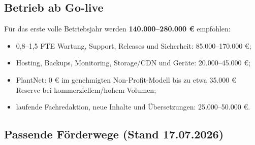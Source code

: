 \documentclass[10pt,a4paper,oneside]{article}
\begin{document}
\subsection{Betrieb ab Go-live}

Für das erste volle Betriebsjahr werden \textbf{140.000--280.000 €} empfohlen:

\begin{itemize}
  \item 0,8--1,5 FTE Wartung, Support, Releases und Sicherheit: 85.000--170.000 €;
  \item Hosting, Backups, Monitoring, Storage/CDN und Geräte: 20.000--45.000 €;
  \item PlantNet: 0 € im genehmigten Non-Profit-Modell bis zu etwa 35.000 € Reserve bei kommerziellem/hohem Volumen;
  \item laufende Fachredaktion, neue Inhalte und Übersetzungen: 25.000--50.000 €.
\end{itemize}

\subsection{Passende Förderwege (Stand 17.07.2026)}
\end{document}
